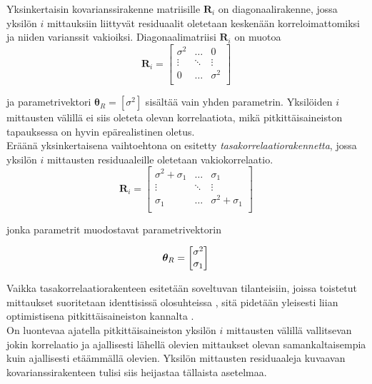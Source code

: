 \documentclass[finnish]{docopts}
\begin{document}
Yksinkertaisin kovarianssirakenne matriisille $\bm{R}_i$ on diagonaalirakenne, jossa yksilön $i$ mittauksiin liittyvät residuaalit oletetaan keskenään korreloimattomiksi ja niiden varianssit vakioiksi. Diagonaalimatriisi $\bm{R}_i$ on muotoa\\

$$
\bm{R}_i =
\begin{bmatrix}
\sigma^2 & \dots & 0 \\
\vdots & \ddots & \vdots \\
0 & \dots & \sigma^2 \\
\end{bmatrix}
$$

ja parametrivektori $\bm{\theta}_R = [\sigma^2]$ sisältää vain yhden parametrin. Yksilöiden $i$ mittausten välillä ei siis oleteta olevan korrelaatiota, mikä pitkittäisaineiston tapauksessa on hyvin epärealistinen oletus. \\

Eräänä yksinkertaisena vaihtoehtona on esitetty \textit{tasakorrelaatiorakennetta}, jossa yksilön $i$ mittausten residuaaleille oletetaan vakiokorrelaatio. \\

$$
\bm{R}_i =
\begin{bmatrix}
\sigma^2 + \sigma_1 & \dots & \sigma_1 \\
\vdots & \ddots & \vdots \\
\sigma_1 & \dots & \sigma^2 + \sigma_1 \\
\end{bmatrix}
$$

jonka parametrit muodostavat parametrivektorin

$$
\bm{\theta}_R =
\begin{bmatrix}
\sigma^2\\
\sigma_1 \\
\end{bmatrix}\\
$$

Vaikka tasakorrelaatiorakenteen esitetään soveltuvan tilanteisiin, joissa toistetut mittaukset suoritetaan identtisissä olosuhteissa \cite{pinheiro00, west14}, sitä pidetään yleisesti liian optimistisena pitkittäisaineiston kannalta \cite{pinheiro00, fitzmaurice11, west14}.\\

On luontevaa ajatella pitkittäisaineiston yksilön $i$ mittausten välillä vallitsevan jokin korrelaatio ja ajallisesti lähellä olevien mittaukset olevan samankaltaisempia kuin ajallisesti etäämmällä olevien. Yksilön mittausten residuaaleja kuvaavan kovarianssirakenteen tulisi siis heijastaa tällaista asetelmaa.\\
\end{document}
